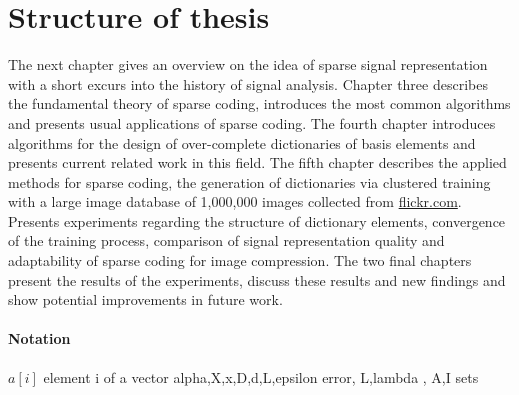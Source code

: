 \section{Structure of thesis}
The next chapter gives an overview on the idea of sparse signal
representation with a short excurs into the history of signal analysis.
Chapter three describes the fundamental theory of sparse coding, introduces the
most common algorithms and presents usual applications of sparse coding. The
fourth chapter introduces algorithms for the design of over-complete
dictionaries of basis elements and presents current related work in this field.
The fifth chapter describes the applied methods for sparse
coding, the generation of dictionaries via clustered training with a large image
database of 1,000,000 images collected from \url{flickr.com}. Presents
experiments regarding the structure of dictionary elements, convergence of the
training process, comparison of signal representation quality and adaptability
of sparse coding for image compression. The two final chapters present the
results of the experiments, discuss these results and new findings and show
potential improvements in future work. 

\paragraph{Notation}
$a[i]$ element i of a vector
alpha,X,x,D,d,L,epsilon error, L,lambda , A,I sets


